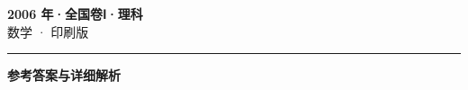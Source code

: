 \documentclass[zihao=5, a4paper]{ctexart}
\begin{document}
\begin{center}
  {\Large\bfseries 2006 年·全国卷Ⅰ·理科}\\[4pt]
  {\large 数学 · 印刷版}
\end{center}
\medskip
{}

\par\bigskip\hrule\bigskip
{}
\begin{center}{\large\bfseries 参考答案与详细解析}\end{center}
\smallskip

\end{document}
